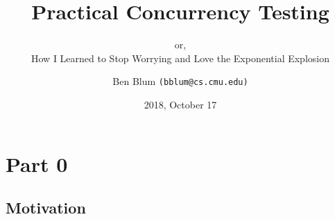 \documentclass[xcolor=dvipsnames]{beamer}
\title[]{{\bf Practical Concurrency Testing}}
\subtitle[]{or, \\ How I Learned to Stop Worrying and Love the Exponential Explosion}
\author[]{Ben Blum \texttt{(bblum@cs.cmu.edu)}}
\institute[]{Carnegie Mellon University}
\date[]{2018, October 17}
\begin{document}
\renewcommand{\inserttotalframenumber}{69}
\normalem
\begin{frame}
	\titlepage
\end{frame}


\newcommand\linegap{\vspace{0.2in}}
\newcommand\breakslide[1]{\begin{frame}{} \begin{center} #1 \end{center} \end{frame}}


\section{Part 0}
\subsection{Motivation}
\end{document}
